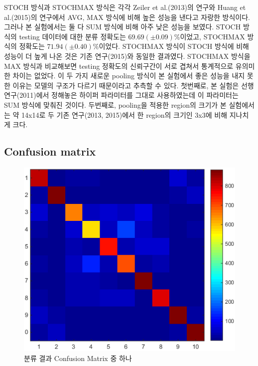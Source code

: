\documentclass[a4paper,9pt]{article}
\begin{document}
\begin{multicols*}{2}
STOCH 방식과 STOCHMAX 방식은 각각 Zeiler et al.(2013)의 연구와 Huang et al.(2015)의 연구에서 AVG, MAX 방식에 비해 높은 성능을 낸다고 자랑한 방식이다.
그러나 본 실험에서는 둘 다 SUM 방식에 비해 아주 낮은 성능을 보였다.
STOCH 방식의 testing 데이터에 대한 분류 정확도는 $69.69(\pm 0.09)$\%이었고, STOCHMAX 방식의 정확도는 $71.94(\pm 0.40)$\%이었다.
STOCHMAX 방식이 STOCH 방식에 비해 성능이 더 높게 나온 것은 기존 연구(2015)와 동일한 결과였다.
STOCHMAX 방식을 MAX 방식과 비교해보면 testing 정확도의 신뢰구간이 서로 겹쳐서 통계적으로 유의미한 차이는 없었다.
이 두 가지 새로운 pooling 방식이 본 실험에서 좋은 성능을 내지 못한 이유는 모델의 구조가 다르기 때문이라고 추측할 수 있다.
첫번째로, 본 실험은 선행 연구(2011)에서 정해놓은 하이퍼 파라미터를 그대로 사용하였는데 이 파라미터는 SUM 방식에 맞춰진 것이다.
두번째로, pooling을 적용한 region의 크기가 본 실험에서는 약 14x14로 두 기존 연구(2013, 2015)에서 한 region의 크기인 3x3에 비해 지나치게 크다.

\subsection{Confusion matrix}

\begin{figure}[H]
\includegraphics[width=\linewidth]{confusion_matrix}
\caption{분류 결과 Confusion Matrix 중 하나}
\label{fig:confusion_matrix}
\end{figure}


\end{multicols*}
\end{document}
